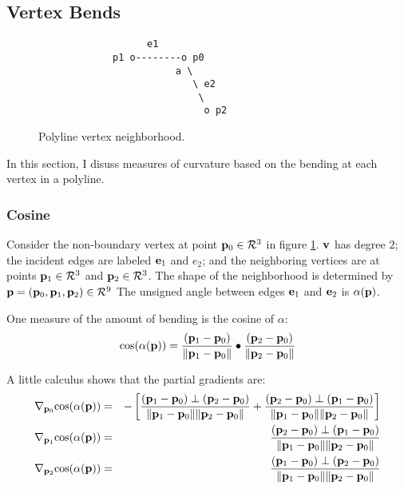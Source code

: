 \subsection{Vertex Bends}
\label{sec:Vertex-Bends}

\begin{figure}[!htp]
\centering
\begin{verbatim}
                   e1
             p1 o--------o p0
                        a \
                           \ e2
                            \
                             o p2
\end{verbatim}
\caption{Polyline vertex neighborhood.
\label{fig:Polyline-vertex-neighborhood}}
\end{figure}

In this section, I disuss measures of curvature
based on the bending at each vertex in a polyline.


\subsubsection{Cosine}
\label{sec:polyline-vertex-cosine}

Consider the non-boundary vertex
at point ${\mathbf p}_0 \in \mathcal{R}^3$ in figure \ref{fig:Polyline-vertex-neighborhood}.
${\mathbf v}$ has degree $2$;
the incident edges are labeled ${\mathbf e}_1$ and $e_2$;
and the neighboring vertices are at points ${\mathbf p}_1 \in \mathcal{R}^3$
and ${\mathbf p}_2 \in \mathcal{R}^3$.
The shape of the neighborhood is determined by
${\mathbf p} = ({\mathbf p}_0, {\mathbf p}_1, {\mathbf p}_2) \in \mathcal{R}^9$
The unsigned angle between edges ${\mathbf e}_1$ and ${\mathbf e}_2$ is $\alpha({\mathbf p})$.

One measure of the amount of bending is the cosine of $\alpha$:
\begin{equation}
\cos(\alpha({\mathbf p})) =
{{({\mathbf p}_1 - {\mathbf p}_0)} \over {\| {\mathbf p}_1 - {\mathbf p}_0 \|} }
\bullet
{{({\mathbf p}_2 - {\mathbf p}_0)} \over {\| {\mathbf p}_2 - {\mathbf p}_0 \|} }
\end{equation}

A little calculus shows that the partial gradients are:
\begin{eqnarray}
\label{eq:polyline-vertex-cosine-gradient}
{\mathbf \nabla}_{{\mathbf p}_0}{\cos(\alpha({\mathbf p}))}
& = &
-
\left[
{{({\mathbf p}_1 - {\mathbf p}_0) \perp  ({\mathbf p}_2 - {\mathbf p}_0)}
\over
{\| {\mathbf p}_1 - {\mathbf p}_0 \| \| {\mathbf p}_2 - {\mathbf p}_0 \|} }
+
{{({\mathbf p}_2 - {\mathbf p}_0) \perp  ({\mathbf p}_1 - {\mathbf p}_0)}
\over
{\| {\mathbf p}_1 - {\mathbf p}_0 \| \| {\mathbf p}_2 - {\mathbf p}_0 \|} }
\right]
\\
{\mathbf \nabla}_{{\mathbf p}_1}{\cos(\alpha({\mathbf p}))}
& = &
{{({\mathbf p}_2 - {\mathbf p}_0) \perp  ({\mathbf p}_1 - {\mathbf p}_0)}
\over
{\| {\mathbf p}_1 - {\mathbf p}_0 \| \| {\mathbf p}_2 - {\mathbf p}_0 \|} }
\nonumber
\\
{\mathbf \nabla}_{{\mathbf p}_2}{\cos(\alpha({\mathbf p}))}
& = &
{{({\mathbf p}_1 - {\mathbf p}_0) \perp  ({\mathbf p}_2 - {\mathbf p}_0)}
\over
{\| {\mathbf p}_1 - {\mathbf p}_0 \| \| {\mathbf p}_2 - {\mathbf p}_0 \|} }
\nonumber
\end{eqnarray}

